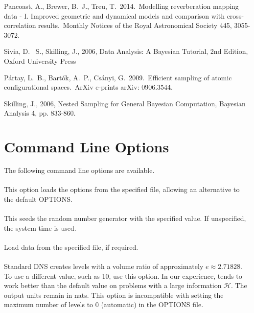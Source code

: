 \documentclass[article]{jss}
\begin{document}
\begin{thebibliography}{99}
 Pancoast, A., Brewer, B.~J., Treu, T.\ 2014.\ Modelling reverberation mapping data - I. Improved geometric and dynamical models and comparison with cross-correlation results.\ Monthly Notices of the Royal Astronomical Society 445, 3055-3072.

 Sivia, 
D.~ S., Skilling, J., 2006, Data Analysis: A Bayesian Tutorial, 2nd 
Edition, Oxford University Press

 P{\'a}rtay, L.~B., 
Bart{\'o}k, A.~P., Cs{\'a}nyi, G.\ 2009.\ Efficient sampling of atomic 
configurational spaces.\ ArXiv e-prints arXiv: 0906.3544. 

 Skilling, J., 2006, Nested Sampling for General Bayesian Computation, Bayesian Analysis 4, pp. 833-860.

\end{thebibliography}

\appendix
\section{Command Line Options}\label{sec:command_line_options}
The following command line options are available.\\

\\
This option loads the  options from the specified file, allowing
an alternative to the default OPTIONS.\\

\\
This seeds the random number generator with the specified value. If unspecified, the system time is used.\\

\\
Load data from the specified file, if required.\\

\\
Standard DNS creates levels with a volume ratio of approximately
$e\approx 2.71828$. To use a different value, such as 10, use this option.
In our experience,  tends to work better than the default
value on problems with a large information $\mathcal{H}$.
The output units remain in nats.
This option is incompatible with setting the maximum number of levels to 0
(automatic) in the OPTIONS file.
\\
\end{document}
